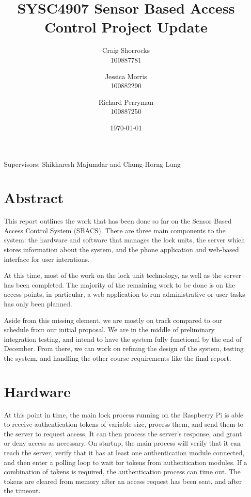 \documentclass{article}
\title{SYSC4907 Sensor Based Access Control Project Update}
\author{
	Craig Shorrocks \\
	100887781
	\and
	Jessica Morris \\
	100882290
	\and
	Richard Perryman \\
	100887250
}
\date{\today}
\begin{document}
\maketitle

\begin{center}
Supervisors: Shikharesh Majumdar and Chung-Horng Lung
\end{center}

\pagebreak

\section{Abstract}

This report outlines the work that has been done so far on the Sensor Based Access Control System (SBACS). There are
three main components to the system: the hardware and software that manages the lock units, the server which stores
information about the system, and the phone application and web-based interface for user interations.

At this time, most of the work on the lock unit technology, as well as the server has been completed. The majority of the
remaining work to be done is on the access points, in particular, a web application to run administrative or user tasks
has only been planned.

Aside from this missing element, we are mostly on track compared to our schedule from our initial proposal. We are in
the middle of preliminary integration testing, and intend to have the system fully functional by the end of December.
From there, we can work on refining the design of the system, testing the system, and handling the other course
requirements like the final report.

\section{Hardware}

At this point in time, the main lock process running on the Raspberry Pi is able to receive authentication tokens of 
variable size, process them, and send them to the server to request access. It can then process the server's response, 
and grant or deny access as necessary. On startup, the main process will verify that it can reach the server, verify 
that it has at least one authentication module connected, and then enter a polling loop to wait for tokens from 
authentication modules. If a combination of tokens is required, the authentication process can time out. The tokens are 
cleared from memory after an access request has been sent, and after the timeout.
\end{document}
